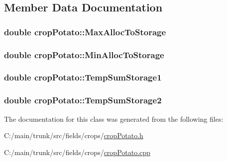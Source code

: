 \subsection{Member Data Documentation}
\hypertarget{classcrop_potato_a45ec67fb693cd9b52fd972cb78dabf9c}{
\subsubsection[{MaxAllocToStorage}]{\setlength{\rightskip}{0pt plus 5cm}double {\bf cropPotato::MaxAllocToStorage}}}
\label{classcrop_potato_a45ec67fb693cd9b52fd972cb78dabf9c}
\hypertarget{classcrop_potato_a0247e61ee73a613c0bd9a9aec1765d46}{
\subsubsection[{MinAllocToStorage}]{\setlength{\rightskip}{0pt plus 5cm}double {\bf cropPotato::MinAllocToStorage}}}
\label{classcrop_potato_a0247e61ee73a613c0bd9a9aec1765d46}
\hypertarget{classcrop_potato_a986fb7be4c5a97f0b5e4199cda9cd6c9}{
\subsubsection[{TempSumStorage1}]{\setlength{\rightskip}{0pt plus 5cm}double {\bf cropPotato::TempSumStorage1}}}
\label{classcrop_potato_a986fb7be4c5a97f0b5e4199cda9cd6c9}
\hypertarget{classcrop_potato_a4844a762de8ce4e50e54aba8fc112202}{
\subsubsection[{TempSumStorage2}]{\setlength{\rightskip}{0pt plus 5cm}double {\bf cropPotato::TempSumStorage2}}}
\label{classcrop_potato_a4844a762de8ce4e50e54aba8fc112202}


The documentation for this class was generated from the following files:\begin{DoxyCompactItemize}
\item 
C:/main/trunk/src/fields/crops/\hyperlink{crop_potato_8h}{cropPotato.h}\item 
C:/main/trunk/src/fields/crops/\hyperlink{crop_potato_8cpp}{cropPotato.cpp}\end{DoxyCompactItemize}
